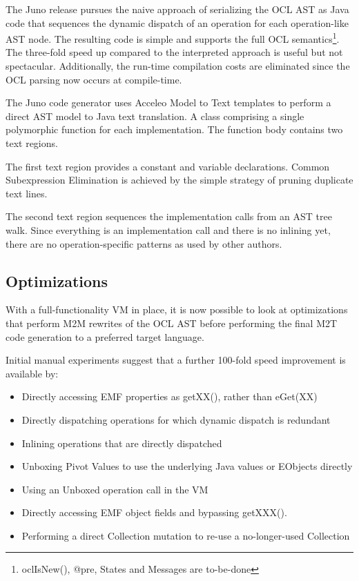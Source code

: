 \documentclass{sig-alternate}
\begin{document}
The Juno release pursues the naive approach of serializing the OCL AST as Java code that sequences the
dynamic dispatch of an operation for each operation-like AST node. The resulting code is simple and supports the
full OCL semantics\footnote{ oclIsNew(), @pre, States and Messages are to-be-done}. The three-fold speed up compared to the interpreted approach is useful but not spectacular. Additionally, the run-time compilation costs are eliminated since the OCL parsing now occurs at compile-time. 

The Juno code generator uses Acceleo Model to Text templates to perform a direct AST model to Java text translation. A class comprising a single polymorphic function for each implementation. The function body contains two text regions. 

The first text region provides a constant and variable declarations. Common Subexpression Elimination is achieved by the simple strategy of pruning duplicate text lines. 

The second text region sequences the implementation calls from an AST tree walk. Since everything is an implementation call and there is no inlining yet, there are no operation-specific patterns as used by other authors.

\subsection{Optimizations}

With a full-functionality VM in place, it is now possible to look at optimizations that perform M2M rewrites of the OCL AST before performing the final M2T code generation to a preferred target language.

Initial manual experiments suggest that a further 100-fold speed improvement is available by:
\begin{itemize}
\item Directly accessing EMF properties as getXX(), rather than eGet(XX) 
\item Directly dispatching operations for which dynamic dispatch is redundant
\item Inlining operations that are directly dispatched
\item Unboxing Pivot Values to use the underlying Java values or EObjects directly
\item Using an Unboxed operation call in the VM 
\item Directly accessing EMF object fields and bypassing getXXX().
\item Performing a direct Collection mutation to re-use a no-longer-used Collection 
\end{itemize}
\end{document}
